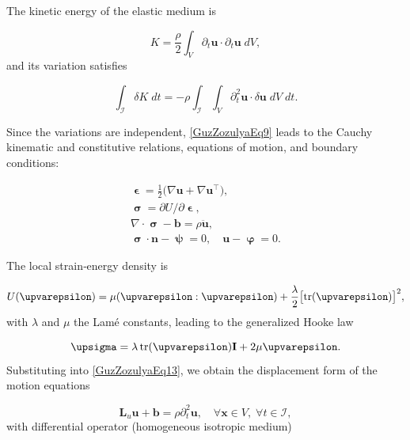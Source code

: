 The kinetic energy of the elastic medium is

\begin{equation}\label{GuzZozulyaEq11} %
	K=\frac{\rho}{2}\int_{V}\partial_{t}\mathbf{u} \!\cdot\! \partial_{t}\mathbf{u} \;dV,
\end{equation}
and its variation satisfies \cite{GuzZozulyaRef1,GuzZozulyaRef15}

\begin{equation}\label{GuzZozulyaEq12} %
	\int_{\mathcal{I}}\delta K \;dt
	=
	-\rho\int_{\mathcal{I}}\int_{V}\partial_{t}^{2}\mathbf{u} \!\cdot\! \delta\mathbf{u} \;dV \;dt.
\end{equation}

Since the variations are independent, \eqref{GuzZozulyaEq9} leads to the Cauchy kinematic and constitutive relations,  
equations of motion, and boundary conditions:

\begin{equation}\label{GuzZozulyaEq13} %
	 \begin{array}{l}
	 	\bm{\upvarepsilon}=\frac12\bigl(\nabla\mathbf{u}+\nabla\mathbf{u}^{ \top}\bigr),
	 	\\
		\bm{\upsigma}={\partial U}/{\partial \bm{\upvarepsilon}},
		\\
		\nabla \!\cdot\! \bm{\upsigma}-\mathbf{b}=\rho \ddot{\mathbf{u}},
		\\
		\bm{\upsigma} \!\cdot\! \mathbf{n}-\bm{\uppsi}=0,\quad
		\mathbf{u}-\bm{\upvarphi}=0.
	 \end{array}
\end{equation}

The local strain‐energy density is

\begin{equation}\label{GuzZozulyaEq14} %
	U( \bm{\upvarepsilon})=\mu ( \bm{\upvarepsilon} :  \bm{\upvarepsilon})
	+\frac{\lambda}{2}\bigl[ \tr( \bm{\upvarepsilon})\bigr]^{2},
\end{equation}
with $\lambda$ and $\mu$ the Lamé constants, leading to the generalized Hooke law

\begin{equation}\label{GuzZozulyaEq15} %
	\bm{\upsigma}=\lambda  \tr( \bm{\upvarepsilon}) \mathbf{I}+2\mu  \bm{\upvarepsilon}.
\end{equation}
Substituting into \eqref{GuzZozulyaEq13}, we obtain the displacement form of the motion equations

\begin{equation}\label{GuzZozulyaEq16} %
	\mathbf{L}_{u} \mathbf{u}+\mathbf{b}=\rho \partial_{t}^{2}\mathbf{u},
	\quad\forall \mathbf{x}\in V,\;\forall t\in\mathcal{I},
\end{equation}
with differential operator (homogeneous isotropic medium)

